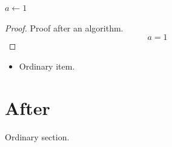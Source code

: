 \documentclass{article}
\begin{document}
\begin{algorithm}
\begin{algorithmic}[1]
\State $a\gets 1$
\end{algorithmic}
\end{algorithm}
\begin{proof}
Proof after an algorithm.
\[a=1\]
\end{proof}
\begin{itemize}\item Ordinary item.\end{itemize}
\section{After}Ordinary section.
\end{document}
